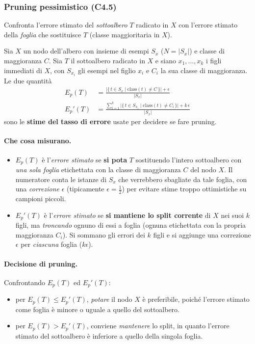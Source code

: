 \subsubsection*{Pruning pessimistico (C4.5)}
Confronta l’errore stimato del \emph{sottoalbero} $T$ radicato in $X$ con l’errore stimato della \emph{foglia} che sostituisce $T$ (classe maggioritaria in $X$).

Sia \(X\) un nodo dell’albero con insieme di esempi \(S_x\) (\(N=|S_x|\)) e classe di maggioranza \(C\).
Sia \(T\) il sottoalbero radicato in \(X\) e siano \(x_1,\dots,x_k\) i figli immediati di \(X\), con
\(S_{x_i}\) gli esempi nel figlio \(x_i\) e \(C_i\) la sua classe di maggioranza. Le due quantità
\[
\begin{aligned}
E_p(T)   &= \frac{\bigl|\{\, t \in S_x \mid \mathrm{class}(t) \neq C \,\}\bigr| + \epsilon}{\lvert S_x\rvert}\\[4pt]
E_p'(T) &= \frac{\displaystyle \sum_{i=1}^{k} \bigl|\{\, t \in S_{x_i} \mid \mathrm{class}(t) \neq C_i \,\}\bigr| + k\,\epsilon}{\lvert S_x\rvert}
\end{aligned}
\]
sono le \textbf{stime del tasso di errore} usate per decidere se fare pruning.

\paragraph{Che cosa misurano.}
\begin{itemize}
  \item \(E_p(T)\) è l’\emph{errore stimato} se \textbf{si pota} \(T\) sostituendo l’intero sottoalbero con \emph{una sola foglia} etichettata con la classe di maggioranza \(C\) del nodo \(X\). Il numeratore conta le istanze di \(S_x\) che verrebbero sbagliate da tale foglia, con una \emph{correzione} \(\epsilon\) (tipicamente \(\epsilon=\tfrac12\)) per evitare stime troppo ottimistiche su campioni piccoli.
  \item \(E_p'(T)\) è l’\emph{errore stimato} se \textbf{si mantiene lo split corrente} di \(X\) nei suoi \(k\) figli, ma \emph{troncando} ognuno di essi a foglia (ognuna etichettata con la propria maggioranza \(C_i\)). Si sommano gli errori dei \(k\) figli e si aggiunge una correzione \(\epsilon\) per \emph{ciascuna} foglia (\(k\epsilon\)).
\end{itemize}

\paragraph{Decisione di pruning.}
Confrontando \(E_p(T)\) ed \(E_p'(T)\):
\begin{itemize}
  \item per \(E_p(T) \le E_p'(T)\), \emph{potare} il nodo \(X\) è preferibile, poiché l’errore stimato come foglia è minore o uguale a quello del sottoalbero.
  \item per \(E_p(T) > E_p'(T)\), conviene \emph{mantenere} lo split, in quanto l’errore stimato del sottoalbero è inferiore a quello della singola foglia.
\end{itemize}

